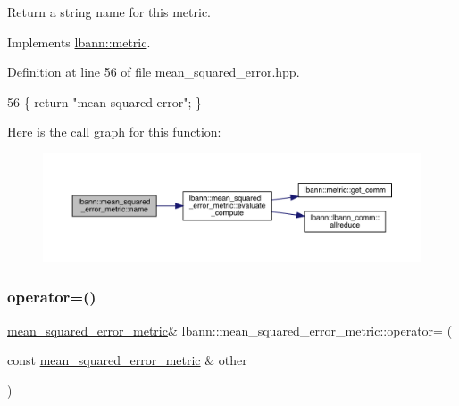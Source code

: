 Return a string name for this metric. 

Implements \hyperlink{classlbann_1_1metric_af455d7b6874d3491bc04f0f2ebfcab51}{lbann\+::metric}.



Definition at line 56 of file mean\+\_\+squared\+\_\+error.\+hpp.


\begin{DoxyCode}
56 \{ \textcolor{keywordflow}{return} \textcolor{stringliteral}{"mean squared error"}; \}
\end{DoxyCode}
Here is the call graph for this function\+:\nopagebreak
\begin{figure}[H]
\begin{center}
\leavevmode
\includegraphics[width=350pt]{classlbann_1_1mean__squared__error__metric_ac5477e6104eaf87fbbe2a13232ee2d9f_cgraph}
\end{center}
\end{figure}
\mbox{\label{classlbann_1_1mean__squared__error__metric_acea91914634adf15d9f4b7978ca2ff51}} 
\subsubsection{\texorpdfstring{operator=()}{operator=()}}
{\footnotesize\ttfamily \hyperlink{classlbann_1_1mean__squared__error__metric}{mean\+\_\+squared\+\_\+error\+\_\+metric}\& lbann\+::mean\+\_\+squared\+\_\+error\+\_\+metric\+::operator= (\begin{DoxyParamCaption}\item[{const \hyperlink{classlbann_1_1mean__squared__error__metric}{mean\+\_\+squared\+\_\+error\+\_\+metric} \&}]{other }\end{DoxyParamCaption})\hspace{0.3cm}{\ttfamily [default]}}

